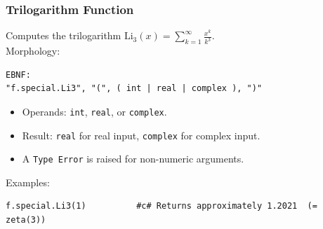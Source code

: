 \subsubsection{Trilogarithm Function}
Computes the trilogarithm $\text{Li}_3(x) = \sum_{k=1}^{\infty} \frac{x^k}{k^3}$. \\
Morphology:
\begin{verbatim}
EBNF:
"f.special.Li3", "(", ( int | real | complex ), ")"
\end{verbatim}
\begin{itemize}
\item Operands: \texttt{int}, \texttt{real}, or \texttt{complex}.
\item Result: \texttt{real} for real input, \texttt{complex} for complex input.
\item A \texttt{Type Error} is raised for non-numeric arguments.
\end{itemize}
Examples:
\begin{verbatim}
f.special.Li3(1)          #c# Returns approximately 1.2021  (= zeta(3))
\end{verbatim}

